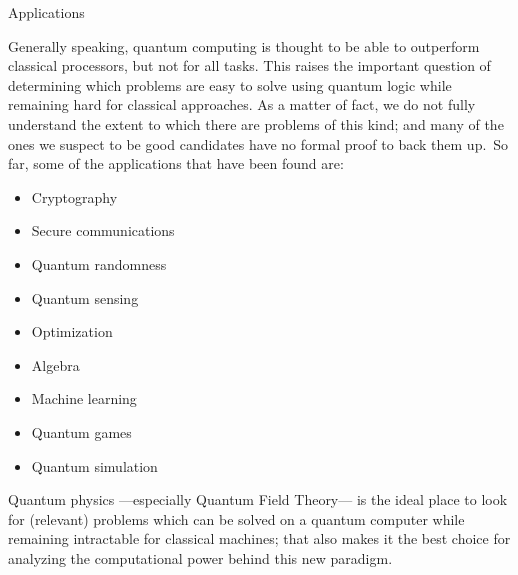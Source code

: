 \documentclass[9pt, handout, aspectratio=169]{beamer}	%
\begin{document}
\begin{frame}{Applications}

	Generally speaking, quantum computing is thought to be able to outperform classical processors, but not for all tasks. This raises the important question of determining which problems are easy to solve using quantum logic while remaining hard for classical approaches. As a matter of fact, we do not fully understand the extent to which there are problems of this kind; and many of the ones we suspect to be good candidates have no formal proof to back them up.\pause~So far, some of the applications that have been found are:

	\begin{multicols}{3}

		\begin{itemize}
			\item Cryptography
			\item Secure communications
			\item Quantum randomness
		\end{itemize}

		\columnbreak

		\begin{itemize}
			\item Quantum sensing
			\item Optimization
			\item Algebra
		\end{itemize}

		\columnbreak

		\begin{itemize}
			\item Machine learning
			\item Quantum games
			\item Quantum simulation
		\end{itemize}

	\end{multicols}

	\pause

	Quantum physics ---especially Quantum Field Theory--- is the ideal place to look for (relevant) problems which can be solved on a quantum computer while remaining intractable for classical machines; that also makes it the best choice for analyzing the computational power behind this new paradigm.

\end{frame}


\end{document}
